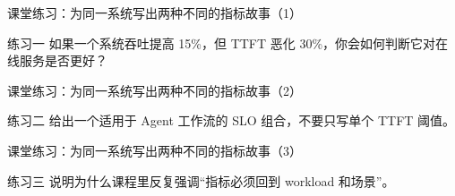 \begin{frame}{课堂练习：为同一系统写出两种不同的指标故事（1）}
\begin{block}{练习一}
    如果一个系统吞吐提高 15\%，但 TTFT 恶化 30\%，你会如何判断它对在线服务是否更好？
  \end{block}
\end{frame}

\begin{frame}{课堂练习：为同一系统写出两种不同的指标故事（2）}
\begin{block}{练习二}
    给出一个适用于 Agent 工作流的 SLO 组合，不要只写单个 TTFT 阈值。
  \end{block}
\end{frame}

\begin{frame}{课堂练习：为同一系统写出两种不同的指标故事（3）}
\begin{block}{练习三}
    说明为什么课程里反复强调“指标必须回到 workload 和场景”。
  \end{block}
\end{frame}
